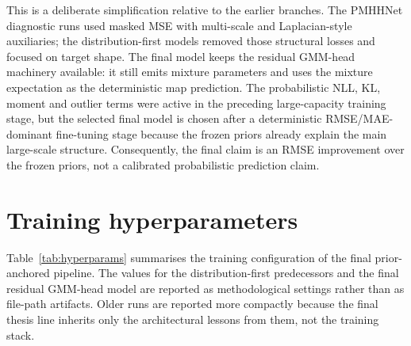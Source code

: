 This is a deliberate simplification relative to the earlier branches. The
PMHHNet diagnostic runs used masked MSE with multi-scale and Laplacian-style auxiliaries; the
distribution-first models removed those structural losses and focused on target
shape. The final model keeps the residual GMM-head machinery available: it
still emits mixture parameters and uses the mixture expectation as the
deterministic map prediction. The probabilistic NLL, KL, moment and outlier
terms were active in the preceding large-capacity training stage, but the
selected final model is chosen after a deterministic RMSE/MAE-dominant
fine-tuning stage because the frozen priors already explain the main
large-scale structure. Consequently, the final claim is an RMSE improvement
over the frozen priors, not a calibrated probabilistic prediction claim.

\section{Training hyperparameters}
\label{sec:hyperparams}

Table~\ref{tab:hyperparams} summarises the training configuration of the
final prior-anchored pipeline. The values for the distribution-first predecessors
and the final residual GMM-head model are reported as methodological settings
rather than as file-path artifacts. Older runs are reported more compactly
because the final thesis line inherits only the architectural lessons from
them, not the training stack.

